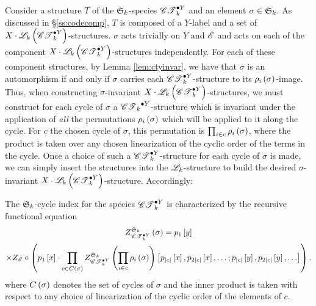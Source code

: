 \documentclass[sectionflow,singlespace,twoside,boldmathhdr,draft]{brandiss} %
\numberwithin{section}{chapter}
\numberwithin{figure}{chapter}
\begin{document}
Consider a structure $T$ of the $\symgp{k}$-species $\pointed[Y]{\specname{CT}}_{k}$ and an element $\sigma \in \symgp{k}$.
As discussed in \S \ref{ss:codecomp}, $T$ is composed of a $Y$-label and a set of $X \cdot \specname{L}_{k} \pbrac{\pointed[Y]{\specname{CT}}_{k}}$-structures.
$\sigma$ acts trivially on $Y$ and $\specname{E}$ and acts on each of the component $X \cdot \specname{L}_{k} \pbrac{\pointed[Y]{\specname{CT}}_{k}}$-structures independently.
For each of these component structures, by Lemma \ref{lem:ctyinvar}, we have that $\sigma$ is an automorphism if and only if $\sigma$ carries each $\pointed[Y]{\specname{CT}}_{k}$-structure to its $\rho_{i} \pbrac{\sigma}$-image.
Thus, when constructing $\sigma$-invariant $X \cdot \specname{L}_{k} \pbrac{\pointed[Y]{\specname{CT}}_{k}}$-structures, we must construct for each cycle of $\sigma$ a $\pointed[Y]{\specname{CT}_{k}}$-structure which is invariant under the application of \emph{all} the permutations $\rho_{i} \pbrac{\sigma}$ which will be applied to it along the cycle.
For $c$ the chosen cycle of $\sigma$, this permutation is $\prod_{i \in c} \rho_{i} \pbrac{\sigma}$, where the product is taken over any chosen linearization of the cyclic order of the terms in the cycle.
Once a choice of such a $\pointed[Y]{\specname{CT}}_{k}$-structure for each cycle of $\sigma$ is made, we can simply insert the structures into the $\specname{L}_{k}$-structure to build the desired $\sigma$-invariant $X \cdot \specname{L}_{k} \pbrac{\pointed[Y]{\specname{CT}}_{k}}$-structure.
Accordingly:
\begin{theorem}
  \label{thm:ctyfuncci}
  The $\symgp{k}$-cycle index for the species $\pointed[Y]{\specname{CT}}_{k}$ is characterized by the recursive functional equation
  \begin{multline}
    \label{eq:ctyfuncci}
    \gci{\symgp{k}}{\pointed[Y]{\specname{CT}}_{k}} \pbrac{\sigma} = p_{1} \sbrac{y} \\
    \times Z_{\specname{E}} \circ \pbrac{p_{1} \sbrac{x} \cdot \prod_{c \in C \pbrac{\sigma}} \gci{\symgp{k}}{\pointed[Y]{\specname{CT}}_{k}} \pbrac{\prod_{i \in c} \rho_{i} \pbrac{\sigma}} \sbrac{p_{\abs{c}} \sbrac{x}, p_{2 \abs{c}} \sbrac{x}, \dots; p_{\abs{c}} \sbrac{y}, p_{2 \abs{c}} \sbrac{y}, \dots}}.
  \end{multline}
  where $C \pbrac{\sigma}$ denotes the set of cycles of $\sigma$ and the inner product is taken with respect to any choice of linearization of the cyclic order of the elements of $c$.
\end{theorem}
\end{document}
